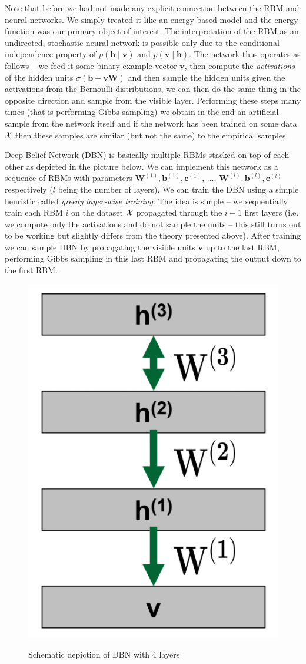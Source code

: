 \documentclass{myclass}
\begin{document}
Note that before we had not made any explicit connection between the RBM and neural networks. We
simply treated it like an energy based model and the energy function was our primary object of
interest. The interpretation of the RBM as an undirected, stochastic neural network is possible only
due to the conditional independence property of $p(\bm{h} \mid \bm{v})$ and $p(\bm{v} \mid \bm{h})$.
The network thus operates as follows -- we feed it some binary example vector $\bm{v}$, then compute
the \emph{activations} of the hidden units $\sigma(\bm{b} + \bm{v}\bm{W})$ and then sample the
hidden units given the activations from the Bernoulli distributions, we can then do the same thing
in the opposite direction and sample from the visible layer. Performing these steps many times (that
is performing Gibbs sampling) we obtain in the end an artificial sample from the network itself and
if the network has been trained on some data $\mathcal{X}$ then these samples are similar (but not the
same) to the empirical samples.

Deep Belief Network (DBN) is basically multiple RBMs stacked on top of each other as depicted in the
picture below. We can implement this network as a sequence of RBMs with parameters $\bm{W}^{(1)},
\bm{b}^{(1)}, \bm{c}^{(1)}$, $\ldots$, $\bm{W}^{(l)}, \bm{b}^{(l)}, \bm{c}^{(l)}$ respectively ($l$
being the number of layers). We can train the DBN using a simple heuristic called \emph{greedy
layer-wise training}. The idea is simple -- we sequentially train each RBM $i$ on the dataset
$\mathcal{X}$ propagated through the $i-1$ first layers (i.e. we compute only the activations and do not
sample the units -- this still turns out to be working but slightly differs from the theory
presented above). After training we can sample DBN by propagating the visible units $\bm{v}$ up to
the last RBM, performing Gibbs sampling in this last RBM and propagating the output down to the
first RBM.

\begin{figure}[ht]
   \centering
   \includegraphics[width=0.45\columnwidth]{figs/dbn.png}
   \label{fig:dbn}
   \caption{Schematic depiction of DBN with 4 layers}
\end{figure}
\end{document}

